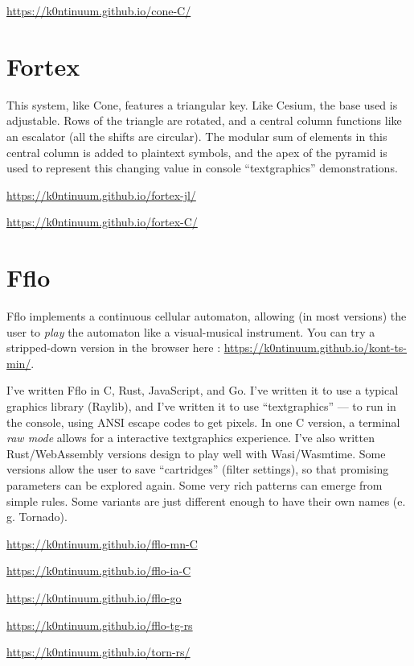 \documentclass{article}
\renewcommand{\i}{\textit}
\newcommand{\q}{\enquote}
\begin{document}
{{\url{https://k0ntinuum.github.io/cone-C/}


\section*{Fortex}

This system, like Cone, features a triangular key. Like Cesium, the base used is adjustable. Rows of the triangle are rotated, and a central column functions like an escalator (all the shifts are circular). The modular sum of elements in this central column is added to plaintext symbols, and the apex of the pyramid is used to represent this changing value in console \q{textgraphics} demonstrations.

\url{https://k0ntinuum.github.io/fortex-jl/}

\url{https://k0ntinuum.github.io/fortex-C/}
  




\section*{Fflo}

Fflo implements a continuous cellular automaton, allowing (in most versions) the user to \i{play} the automaton like a visual-musical instrument. You can try a stripped-down version in the browser here : \url{https://k0ntinuum.github.io/kont-ts-min/}.  

I've written Fflo  in C, Rust, JavaScript, and Go. I've written it to use a typical graphics library (Raylib), and I've written it to use \q{textgraphics} --- to run in the console, using ANSI escape codes to get pixels. In one C version, a terminal \i{raw mode} allows for a interactive textgraphics experience. I've also written Rust/WebAssembly versions design to play well with Wasi/Wasmtime. Some versions allow the user to save \q{cartridges} (filter settings), so that promising parameters can be explored again. Some very rich patterns can emerge from simple rules. Some variants are just different enough to have their own names (e. g. Tornado).

\url{https://k0ntinuum.github.io/fflo-mn-C}

\url{https://k0ntinuum.github.io/fflo-ia-C}

\url{https://k0ntinuum.github.io/fflo-go}

\url{https://k0ntinuum.github.io/fflo-tg-rs}

\url{https://k0ntinuum.github.io/torn-rs/}

}}
\end{document}
